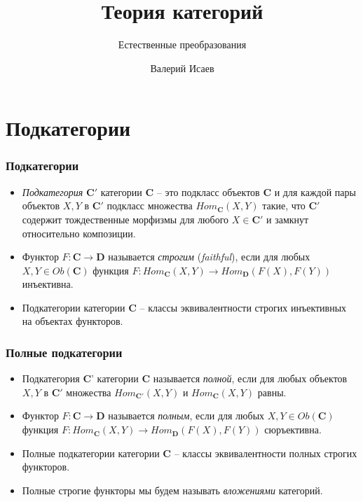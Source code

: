 \documentclass{beamer}
\theoremstyle{definition}
\newcommand{\cat}[1]{\mathbf{#1}}
\renewcommand{\C}{\cat{C}}
\newcommand{\D}{\cat{D}}
\begin{document}
\title{Теория категорий}
\subtitle{Естественные преобразования}
\author{Валерий Исаев}
\maketitle

\section{Подкатегории}

\begin{frame}
\frametitle{Подкатегории}
\begin{itemize}
\item \emph{Подкатегория} $\C'$ категории $\C$ -- это подкласс объектов $\C$ и для каждой пары объектов $X,Y$ в $\C'$ подкласс множества $Hom_\C(X,Y)$ такие, что $\C'$ содержит тождественные морфизмы для любого $X \in \C'$ и замкнут относительно композиции.
\item Функтор $F : \C \to \D$ называется \emph{строгим} (\emph{faithful}), если для любых $X,Y \in Ob(\C)$ функция $F : Hom_\C(X,Y) \to Hom_\D(F(X),F(Y))$ инъективна.
\item Подкатегории категории $\C$ -- классы эквивалентности строгих инъективных на объектах функторов.
\end{itemize}
\end{frame}

\begin{frame}
\frametitle{Полные подкатегории}
\begin{itemize}
\item Подкатегория $\C$' категории $\C$ называется \emph{полной}, если для любых объектов $X,Y$ в $\C'$ множества $Hom_{\C'}(X,Y)$ и $Hom_\C(X,Y)$ равны.
\item Функтор $F : \C \to \D$ называется \emph{полным}, если для любых $X,Y \in Ob(\C)$ функция $F : Hom_\C(X,Y) \to Hom_\D(F(X),F(Y))$ сюръективна.
\item Полные подкатегории категории $\C$ -- классы эквивалентности полных строгих функторов.
\item Полные строгие функторы мы будем называть \emph{вложениями} категорий.
\end{itemize}
\end{frame}
\end{document}
